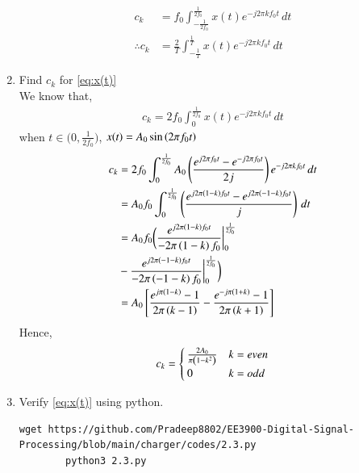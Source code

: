 \documentclass[journal,12pt,twocolumn]{IEEEtran}
\renewcommand\thesection{\arabic{section}}
\begin{document}
\begin{enumerate}[label=\thesection.\arabic*,ref=\thesection.\theenumi]
\begin{align}
    	\end{align}
    \begin{align}
  c_k &= f_0\int_{-\frac{1}{2f_0}}^{\frac{1}{2f_0}}x(t)e^{-j2\pi kf_0 t}\, dt\\
  \therefore c_k &= \frac{2}{T} \int_{-\frac{1}{T}}^{\frac{1}{T}}x(t)e^{-j2\pi kf_0 t}\, dt
    \end{align}
        \item Find $c_k$ for 
        \eqref{eq:x(t)}\\
        \solution
        We know that,
        \begin{align}
        c_k = 2f_0\int_{0}^{\frac{1}{2f_0}}x(t)e^{- j2 \pi kf_0 t}\, dt
        \end{align}
when $t \in \bigg( 0,\frac{1}{2f_0}\bigg)$, $x(t)=A_0 \sin\left(2 \pi f_0t\right)$\\
      \begin{align}
      c_k &= 2f_0\int_{0}^{\frac{1}{2f_0}}A_0 \left(\frac{e^{j2\pi f_0t}-e^{-j 2\pi f_0t}}{2j}\right) e^{- j2 \pi kf_0 t}\,dt\\
      &=A_0f_0\int_{0}^{\frac{1}{2f_0}} \left(\frac{e^{j2\pi\left(1-k\right) f_0t}-e^{j 2\pi\left(-1-k\right) f_0t}}{j}\right)\,dt\\
&=A_0f_0\bigg(\frac{e^{j2\pi\left(1-k\right) f_0t}}{-2\pi \left(1-k\right)f_0}\bigg|_0^{\frac{1}{2f_0}} \\&- \frac{e^{j2\pi\left(-1-k\right) f_0t}}{-2\pi \left(-1-k\right)f_0}\bigg|_0^{\frac{1}{2f_0}}\bigg)\\
&=A_0{}\left[\frac{e^{j\pi\left(1-k\right)}-1}{2\pi\left(k-1\right)}-\frac{e^{-j\pi\left(1+k\right)}-1}{2\pi\left(k+1\right)}\right]
      \end{align}
  Hence,
      \begin{equation}
      \label{eq:ck}
     c_k= \begin{cases}
\frac{2A_0}{\pi\left(1-k^2\right)}&k=even
\\
0&k=odd
\end{cases}
      \end{equation}
    \item Verify 
        \eqref{eq:x(t)}
        using python.\\
        \solution 
        \begin{lstlisting}
wget https://github.com/Pradeep8802/EE3900-Digital-Signal-Processing/blob/main/charger/codes/2.3.py
        python3 2.3.py
        \end{lstlisting}
          \begin{figure}[!ht]
			\centering

\end{figure}
\end{enumerate}
\end{document}

